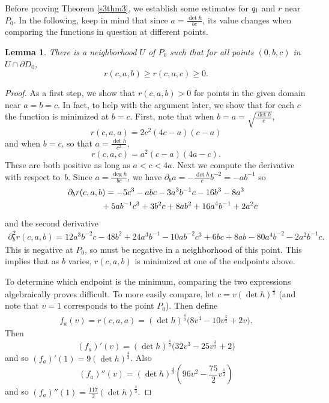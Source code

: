 \documentclass[pdftex]{sigma}
\numberwithin{equation}{section}
\newtheorem{Lemma}[Theorem]{Lemma}
\newcommand{\dvar}[1]{\partial_{#1}} %
\begin{document}
Before proving Theorem \ref{s3thm3}, we establish some estimates for $q_{\rm I}$ and $r$ near $P_0$.
In the following, keep in mind that since $a = \frac{\det h}{bc}$, its value changes when comparing the functions in question at different points.

\begin{Lemma} \label{s3abcequalrlemma}
There is a neighborhood $U$ of $P_0$ such that for all points $(0, b, c)$ in $U \cap \partial D_0$,
\[
r(c, a, b) \geq r(c, a, c) \geq 0.
\]
\end{Lemma}

\begin{proof}As a first step, we show that $r(c, a, b) > 0$ for points in the given domain near $a = b = c$. In fact, to help with the argument later, we show that for each $c$ the function is minimized at $b = c$. First, note that when $b = a = \sqrt{\frac{\det h}{c}}$,
\[
r(c, a, a) = 2c^2(4c - a)(c - a)
\]
and when $b = c$, so that $a = \frac{\det h}{c^2}$,
\[
r(c, a, c) = a^2(c - a)(4a - c). \]
These are both positive as long as $a < c < 4a$. Next we compute the derivative with respect to~$b$. Since $a = \frac{\deg h}{bc}$, we have $\dvar{b} a = - \frac{\det h}{c} b^{-2} = -a b^{-1}$ so
\begin{gather*}
\dvar{b} r(c, a, b) = -5c^3 - abc -3a^3 b^{-1} c - 16b^3 - 8a^3\\
\hphantom{\dvar{b} r(c, a, b) =}{} + 5ab^{-1} c^3 + 3b^2 c + 8ab^2 +16 a^4 b^{-1} + 2a^2c
\end{gather*}
and the second derivative
\begin{gather*}
\dvar{b}^2 r(c, a, b) = 12a^3 b^{-2} c - 48b^2 + 24 a^3 b^{-1} - 10ab^{-2}c^3
		 + 6bc + 8ab - 80 a^4b^{-2} - 2a^2 b^{-1} c.
\end{gather*}
This is negative at $P_0$, so must be negative in a neighborhood of this point. This implies that as $b$ varies, $r(c, a, b)$ is minimized at one of the endpoints above.

To determine which endpoint is the minimum, comparing the two expressions algebraically proves difficult. To more easily compare, let $c = v (\det h)^{\frac{1}{3}}$ (and note that $v = 1$ corresponds to the point $P_0$). Then define
\begin{gather*}
f_a(v) = r(c, a, a) = (\det h)^{\frac{4}{3}}\big(8v^4 - 10 v^{\frac{5}{2}} + 2 v\big).
\end{gather*}
Then
\[
(f_a)'(v) = (\det h)^{\frac{4}{3}}\big(32 v^3 - 25 v^{\frac{3}{2}} + 2\big)
\]
and so $(f_a)'(1) = 9 (\det h)^{\frac{4}{3}}$. Also
\[
(f_a)''(v) = (\det h)^{\frac{4}{3}} \left(96 v^2 - \frac{75}{2} v^{\frac{1}{2}} \right)
\]
and so $(f_a)''(1) = \frac{117}{2} (\det h)^{\frac{4}{3}}$.


\end{proof}
\end{document}
